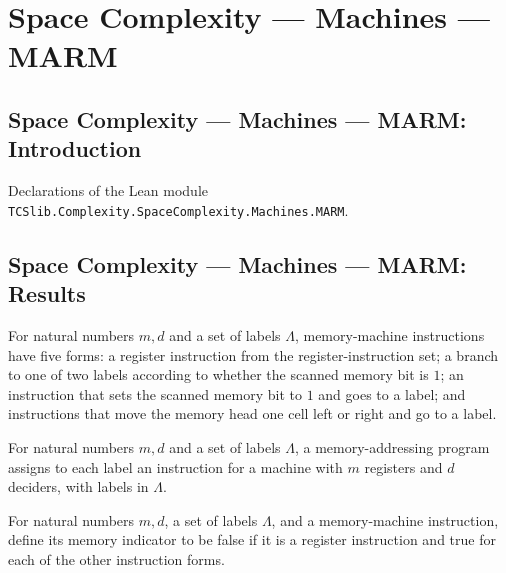 \section{Space Complexity --- Machines --- MARM}
\subsection*{Space Complexity --- Machines --- MARM: Introduction}

Declarations of the Lean module \texttt{TCSlib.Complexity.SpaceComplexity.Machines.MARM}.

\subsection*{Space Complexity --- Machines --- MARM: Results}

\begin{definition}
\label{Complexity.LogProg.MIns}
\leanok
{}
For natural numbers $m,d$ and a set of labels $\Lambda$, memory-machine instructions
have five forms: a register instruction from the register-instruction set; a branch to
one of two labels according to whether the scanned memory bit is $1$; an instruction
that sets the scanned memory bit to $1$ and goes to a label; and instructions that move
the memory head one cell left or right and go to a label.
\end{definition}

\begin{definition}
\label{Complexity.LogProg.MARM}
\leanok
{}
For natural numbers $m,d$ and a set of labels $\Lambda$, a memory-addressing program
assigns to each label an instruction for a machine with $m$ registers and $d$ deciders,
with labels in $\Lambda$.
\end{definition}

\begin{definition}
\label{Complexity.LogProg.MIns.isMem}
\leanok
{}
For natural numbers $m,d$, a set of labels $\Lambda$, and a memory-machine instruction,
define its memory indicator to be false if it is a register instruction and true for
each of the other instruction forms.
\end{definition}

